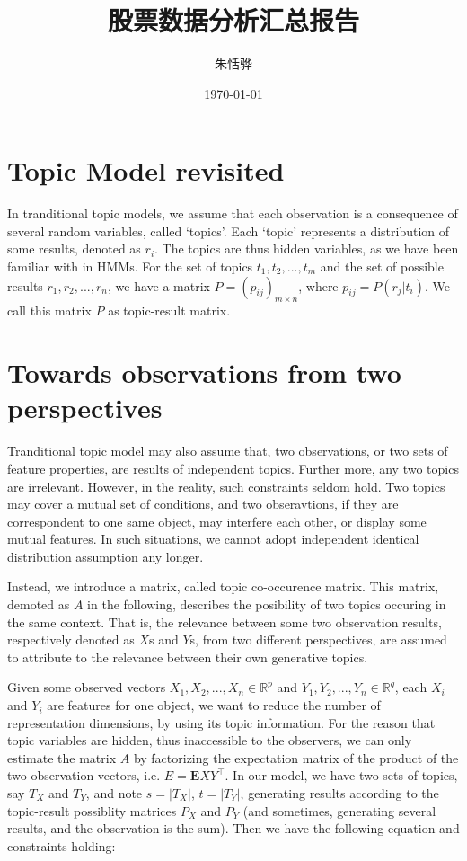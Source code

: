 \documentclass[12pt]{article}
\begin{document}
\title{股票数据分析汇总报告}
\author{朱恬骅}
\date{\today}

\maketitle

\section{Topic Model revisited}
In tranditional topic models, we assume that each observation is a consequence of several random variables, called `topics'. Each `topic' represents a distribution of some results, denoted as $r_i$. The topics are thus hidden variables, as we have been familiar with in HMMs. For the set of topics ${t_1, t_2, ..., t_m}$ and the set of possible results ${r_1, r_2, ..., r_n}$, we have a matrix $P = (p_{ij})_{m \times n}$, where $p_{ij} = P(r_j|t_i)$. We call this matrix $P$ as topic-result matrix.

\section{Towards observations from two perspectives}
Tranditional topic model may also assume that, two observations, or two sets of feature properties, are results of independent topics. Further more, any two topics are irrelevant. However, in the reality, such constraints seldom hold. Two topics may cover a mutual set of conditions, and two obseravtions, if they are correspondent to one same object, may interfere each other, or display some mutual features. In such situations, we cannot adopt independent identical distribution assumption any longer.

Instead, we introduce a matrix, called topic co-occurence matrix. This matrix, demoted as $A$ in the following, describes the posibility of two topics occuring in the same context. That is, the relevance between some two observation results, respectively denoted as $X$s and $Y$s, from two different perspectives, are assumed to attribute to the relevance between their own generative topics.

Given some observed vectors $X_1, X_2, ..., X_n \in \mathbb{R}^p$ and $Y_1, Y_2, ..., Y_n \in \mathbb{R}^q$, each $X_i$ and $Y_i$ are features for one object, we want to reduce the number of representation dimensions, by using its topic information. For the reason that topic variables are hidden, thus inaccessible to the observers, we can only estimate the matrix $A$ by factorizing the expectation matrix of the product of the two observation vectors, i.e. $E = \mathbf{E}XY^\top$. In our model, we have two sets of topics, say $T_X$ and $T_Y$, and note $s = |T_X|$, $t = |T_Y|$, generating results according to the topic-result possiblity matrices $P_X$ and $P_Y$ (and sometimes, generating several results, and the observation is the sum). Then we have the following equation and constraints holding:
\end{document}
